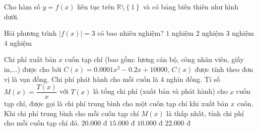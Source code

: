 \begin{ex}%
Cho hàm số $y=f(x)$ liên tục trên $\mathbb{R}\setminus\left\{1\right\}$ và có bảng biến thiên như hình dưới.
\begin{center}
\end{center}
Hỏi phương trình $|f(x)|=3$ có bao nhiêu nghiệm?
\choice
{$1$ nghiệm}
{$2$ nghiệm}
{ \True$3$ nghiệm}
{$4$ nghiệm}
\end{ex}
\begin{ex}%
Chi phí xuất bản $x$ cuốn tạp chí (bao gồm: lương cán bộ, công nhân viên, giấy in,...) được cho bởi 
$C(x)=0{.}0001x^2-0{.}2x+10000$, $C(x)$ được tính theo đơn vị là vạn đồng. Chi phí phát hành cho mỗi cuốn là $4$ nghìn đồng. Tỉ số $M(x)=\dfrac{T(x)}{x}$ với $T(x)$ là tổng chi phí (xuất bản và phát hành) cho $x$ cuốn tạp chí, được gọi là chi phí trung bình cho một cuốn tạp chí khi xuất bản $x$ cuốn. Khi chi phí trung bình cho mỗi cuốn tạp chí $M(x)$ là thấp nhất, tính chi phí cho mỗi cuốn tạp chí đó.
\choice
{$20.000$ đ}
{$15.000$ đ}
{$10.000$ đ}
{ \True $22.000$ đ}
\end{ex}
